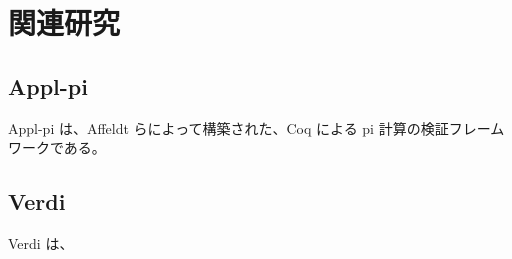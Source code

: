 \chapter{関連研究}

\section{Appl-pi}

Appl-pi は、Affeldt らによって構築された、Coq による pi 計算の検証フレームワークである。

\section{Verdi}

Verdi は、
